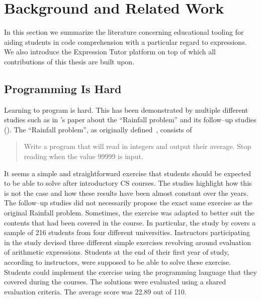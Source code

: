 \chapter{Background and Related Work}\label{sec:bg-rw}

\begin{chapterBody}

In this section we summarize the literature concerning educational tooling for
aiding students in code comprehension with a particular regard to expressions.
We also introduce the Expression Tutor platform on top of which all contributions
of this thesis are built upon.

\section{Programming Is Hard}

Learning to program is hard. This has been demonstrated by multiple different
studies such as in \citet{soloway_learning_1986}'s paper about the
``Rainfall problem'' and its follow–up studies
(\citet{mccracken_multi-national_2001, simon_soloways_2013, seppala_we_2015}).
The ``Rainfall problem'', as originally defined~\cite{soloway_learning_1986}, 
consists of
\begin{quote}
Write a program that will read in integers and output their average. Stop
reading when the value 99999 is input.
\end{quote}

It seems a simple and straightforward exercise that students should be expected
to be able to solve after introductory CS courses. The studies highlight how
this is not the case and how these results have been almost constant over the
years. The follow–up studies did not necessarily propose the exact same
exercise as the original Rainfall problem. Sometimes, the exercise was adapted
to better suit the contents that had been covered in the course.
In particular, the study by \citet{mccracken_multi-national_2001}
covers a sample of 216 students from four different universities. 
Instructors participating in the study devised three different simple exercises
revolving around evaluation of arithmetic expressions. Students at the end of
their first year of study, according to instructors, were supposed to be able
to solve these exercise. Students could implement the exercise using the
programming language that they covered during the courses. The solutions were
evaluated using a shared evaluation criteria. The average score was 22.89 out
of 110.


\end{chapterBody}
